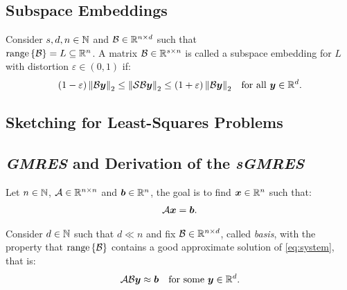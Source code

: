 \subsection{Subspace Embeddings}

\begin{definition}
    Consider $s, d, n \in \mathbb{N}$ and $\mathcal{B} \in \mathbb{R}^{n \times d}$ such that \\ $\operatorname*{range}\left\{\mathcal{B}\right\} = L \subseteq \mathbb{R}^{n}$. A matrix $\mathcal{B} \in \mathbb{R}^{s \times n}$ is called a subspace embedding for $L$ with distortion $\varepsilon \in \left(0, 1\right)$ if:
    \begin{align}
        \left( 1 - \varepsilon \right) \left\lVert \mathcal{B} \bm{y} \right\rVert_2 \leq \left\lVert \mathcal{S} \mathcal{B} \bm{y} \right\rVert_2 &\leq \left( 1 + \varepsilon \right) \left\lVert \mathcal{B} \bm{y} \right\rVert_2 &\text{for all } \bm{y} \in \mathbb{R}^{d}.
    \end{align}
\end{definition}

\subsection{Sketching for Least-Squares Problems}


\subsection{\textit{GMRES} and Derivation of the \textit{sGMRES}}

Let $n \in \mathbb{N}$,  $\mathcal{A} \in \mathbb{R}^{n \times n}$ and $\bm{b} \in \mathbb{R}^{n}$, the goal is to find $\bm{x} \in \mathbb{R}^{n}$ such that:
\begin{align}
    \mathcal{A} \bm{x} = \bm{b}. \label{eq:system}
\end{align}

Consider $d \in \mathbb{N}$ such that $d \ll n$ and fix $\mathcal{B} \in \mathbb{R}^{n \times d}$, called \textit{basis}, with the property that $\operatorname*{range}\left\{\mathcal{B}\right\}$ contains a good approximate solution of \cref{eq:system}, that is:
\begin{align}
    \mathcal{A} \mathcal{B} \bm{y} &\approx \bm{b} &\text{for some } \bm{y} \in \mathbb{R}^{d}. \label{eq:app_system}
\end{align}

